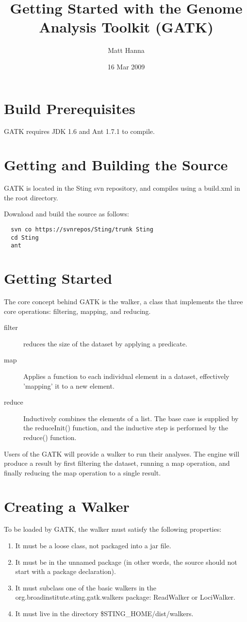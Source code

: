 \documentclass[11pt,fullpage]{article}
\begin{document}
\title{Getting Started with the Genome Analysis Toolkit (GATK)}
\author{Matt Hanna}
\date{16 Mar 2009}
\maketitle

\section{Build Prerequisites}
GATK requires JDK 1.6 and Ant 1.7.1 to compile.

\section{Getting and Building the Source}
GATK is located in the Sting svn repository, and
compiles using a build.xml in the root directory.

Download and build the source as follows:
\begin{verbatim}
  svn co https://svnrepos/Sting/trunk Sting
  cd Sting
  ant
\end{verbatim}

\section{Getting Started}
The core concept behind GATK is the walker, a class that implements the 
three core operations: filtering, mapping, and reducing.

\begin{description}
  \item [filter] reduces the size of the dataset by applying a predicate.  
  \item [map] Applies a function to each individual element in a dataset, 
    effectively 'mapping' it to a new element.
  \item [reduce] Inductively combines the elements of a list.  The base
    case is supplied by the reduceInit() function, and the inductive step
    is performed by the reduce() function.
\end{description}
Users of the GATK will provide a walker to run their analyses.  The engine
will produce a result by first filtering the dataset, running a map operation,
and finally reducing the map operation to a single result.  

\section{Creating a Walker}
To be loaded by GATK, the walker must satisfy the following properties:
\begin{enumerate}
  \item It must be a loose class, not packaged into a jar file.
  \item It must be in the unnamed package (in other words, the source
    should not start with a package declaration).
  \item It must subclass one of the basic walkers in the 
    org.broadinstitute.sting.gatk.walkers package: ReadWalker or 
    LociWalker.
  \item It must live in the directory \$STING\_HOME/dist/walkers.
\end{enumerate}
\end{document}
